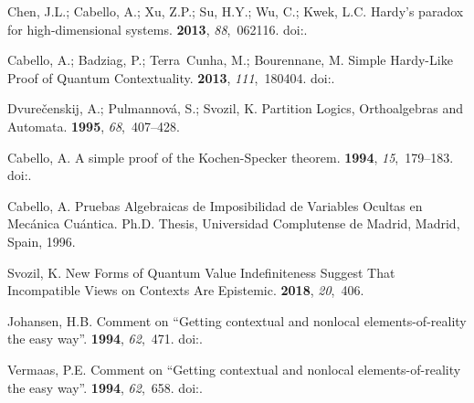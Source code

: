\begin{thebibliography}{999}
Chen, J.L.; Cabello, A.; Xu, Z.P.; Su, H.Y.; Wu, C.; Kwek, L.C.
\newblock Hardy's paradox for high-dimensional systems.
 {\bf 2013}, {\em 88},~062116.
\newblock
 doi:{\href{https://doi.org/10.1103/PhysRevA.88.062116}{}}.

Cabello, A.; Badziag, P.; Terra~Cunha, M.; Bourennane, M.
\newblock Simple {H}ardy-Like Proof of Quantum Contextuality.
 {\bf 2013}, {\em 111},~180404.
\newblock
 doi:{\href{https://doi.org/10.1103/PhysRevLett.111.180404}{}}.

Dvure{\v{c}}enskij, A.; Pulmannov{\'{a}}, S.; Svozil, K.
\newblock Partition Logics, Orthoalgebras and Automata.
 {\bf 1995}, {\em 68},~407--428.

Cabello, A.
\newblock A simple proof of the {K}ochen-{S}pecker theorem.
 {\bf 1994}, {\em 15},~179--183.
\newblock
 doi:{\href{https://doi.org/10.1088/0143-0807/15/4/004}{}}.

Cabello, A.
\newblock Pruebas Algebraicas de Imposibilidad de Variables Ocultas en
 Mec{\'a}nica Cu{\'a}ntica.
\newblock Ph.D. Thesis, Universidad Complutense de Madrid, Madrid, Spain, 1996.

Svozil, K.
\newblock New Forms of Quantum Value Indefiniteness Suggest That Incompatible
 Views on Contexts Are Epistemic.
 {\bf 2018}, {\em 20},~406.

Johansen, H.B.
\newblock  Comment on ``Getting contextual and nonlocal elements-of-reality the
 easy way''.
 {\bf 1994}, {\em 62},~471.
\newblock
 doi:{\href{https://doi.org/10.1119/1.17551}{}}.

Vermaas, P.E.
\newblock  Comment on ``Getting contextual and nonlocal elements-of-reality the
 easy way''.
 {\bf 1994}, {\em 62},~658.
\newblock
 doi:{\href{https://doi.org/10.1119/1.17488}{}}. %


\end{thebibliography}
